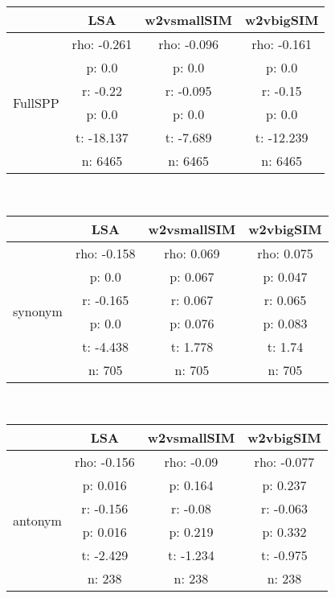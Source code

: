\documentclass{article}
\begin{document}
\begin{tabular}{cccc|}\cline{2-4}
&\multicolumn{1}{|c}{LSA} & w2vsmallSIM & w2vbigSIM \\\hline
\multicolumn{1}{|c|}{\multirow{6}{*}{FullSPP}} & rho: -0.261 & rho: -0.096 & rho: -0.161 \\
\multicolumn{1}{|c|}{} & p: 0.0 & p: 0.0 & p: 0.0 \\
\multicolumn{1}{|c|}{} & r: -0.22 & r: -0.095 & r: -0.15 \\
\multicolumn{1}{|c|}{} & p: 0.0 & p: 0.0 & p: 0.0 \\
\multicolumn{1}{|c|}{} & t: -18.137 & t: -7.689 & t: -12.239 \\
\multicolumn{1}{|c|}{} & n: 6465 & n: 6465 & n: 6465 \\
\hline
\end{tabular}\\
\begin{tabular}{cccc|}\cline{2-4}
&\multicolumn{1}{|c}{LSA} & w2vsmallSIM & w2vbigSIM \\\hline
\multicolumn{1}{|c|}{\multirow{6}{*}{synonym}} & rho: -0.158 & rho: 0.069 & rho: 0.075 \\
\multicolumn{1}{|c|}{} & p: 0.0 & p: 0.067 & p: 0.047 \\
\multicolumn{1}{|c|}{} & r: -0.165 & r: 0.067 & r: 0.065 \\
\multicolumn{1}{|c|}{} & p: 0.0 & p: 0.076 & p: 0.083 \\
\multicolumn{1}{|c|}{} & t: -4.438 & t: 1.778 & t: 1.74 \\
\multicolumn{1}{|c|}{} & n: 705 & n: 705 & n: 705 \\
\hline
\end{tabular}\\
\begin{tabular}{cccc|}\cline{2-4}
&\multicolumn{1}{|c}{LSA} & w2vsmallSIM & w2vbigSIM \\\hline
\multicolumn{1}{|c|}{\multirow{6}{*}{antonym}} & rho: -0.156 & rho: -0.09 & rho: -0.077 \\
\multicolumn{1}{|c|}{} & p: 0.016 & p: 0.164 & p: 0.237 \\
\multicolumn{1}{|c|}{} & r: -0.156 & r: -0.08 & r: -0.063 \\
\multicolumn{1}{|c|}{} & p: 0.016 & p: 0.219 & p: 0.332 \\
\multicolumn{1}{|c|}{} & t: -2.429 & t: -1.234 & t: -0.975 \\
\multicolumn{1}{|c|}{} & n: 238 & n: 238 & n: 238 \\
\hline
\end{tabular}\\
\end{document}
